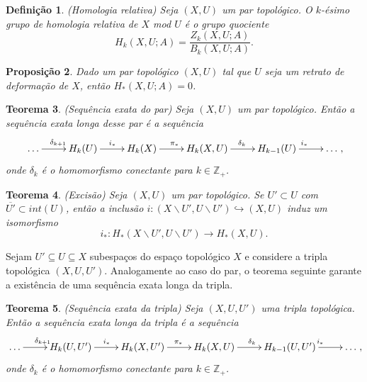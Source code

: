 \documentclass[12pt]{book}
\newtheorem{teorema}{Teorema}[section]
\newtheorem{definicao}[teorema]{Definição}
\newtheorem{proposicao}[teorema]{Proposição}
\newcommand{\complementar}[2]{#1 \backslash #2}
\newcommand{\homologia}[2]{H_{#1}(#2;A)}
\newcommand{\homologiaabrev}[2]{H_{#1}(#2)}
\newcommand{\imagembordo}[2]{B_{#1}(#2;A)}
\newcommand{\inteiros}{\mathbb{Z}}
\newcommand{\inteirospos}{\inteiros_{+}}
\newcommand{\kernelbordo}[2]{Z_{#1}(#2;A)}
\begin{document}
	\begin{definicao}
		(Homologia relativa) Seja $(X, U)$ um par topológico. O $k$-ésimo grupo de homologia relativa de $X$ mod $U$ é o grupo quociente
		$$
		\homologia{k}{X,U} = \frac{\kernelbordo{k}{X,U}}{\imagembordo{k}{X, U}}.
		$$
	\end{definicao}
	
	\begin{proposicao}
		Dado um par topológico $(X, U)$ tal que $U$ seja um retrato de deformação de $X$, então $\homologia{*}{X,U} = 0$.
	\end{proposicao}
	
	\begin{teorema}
		(Sequência exata do par) Seja $(X, U)$ um par topológico. Então a sequência exata longa desse par é a sequência
		$$
		\xymatrix{\dots \ar[r]^{\delta_{k+1}} & \homologiaabrev{k}{U}\ar[r]^{i_{*}} & \homologiaabrev{k}{X}\ar[r]^{\pi_{*}}& \homologiaabrev{k}{X, U}\ar[r]^{\delta_{k}} & \homologiaabrev{k-1}{U} \ar[r]^{i_{*}}& \dots},
		$$
		onde $\delta_{k}$ é o homomorfismo conectante para $k \in \inteirospos$.
	\end{teorema}
	
	\begin{teorema}
		(Excisão) Seja $(X, U)$ um par topológico. Se $U' \subset U$ com $\overline{U'} \subset int(U)$, então a inclusão $i : (\complementar{X}{U'}, \complementar{U}{U'}) \hookrightarrow (X, U)$ induz um isomorfismo 
		$$
		i_{*}: \homologiaabrev{*}{\complementar{X}{U'}, \complementar{U}{U'}} \to \homologiaabrev{*}{X, U}.
		$$
	\end{teorema}
	
	
	Sejam $U'\subseteq U \subseteq X$ subespaços do espaço topológico $X$ e considere a tripla topológica $(X, U, U')$. Analogamente ao caso do par, o teorema seguinte garante a existência de uma sequência exata longa da tripla.
	
	\begin{teorema}
		(Sequência exata da tripla) Seja $(X, U, U')$ uma tripla topológica. Então a sequência exata longa da tripla é a sequência
		$$
		\xymatrix{\dots \ar[r]^{\delta_{k+1}} & \homologiaabrev{k}{U, U'}\ar[r]^{i_{*}} & \homologiaabrev{k}{X, U'}\ar[r]^{\pi_{*}}& \homologiaabrev{k}{X, U}\ar[r]^{\delta_{k}} & \homologiaabrev{k-1}{U, U'} \ar[r]^{i_{*}}& \dots},
		$$
		onde $\delta_{k}$ é o homomorfismo conectante para $k \in \inteirospos$.
	\end{teorema}
	
\end{document}
